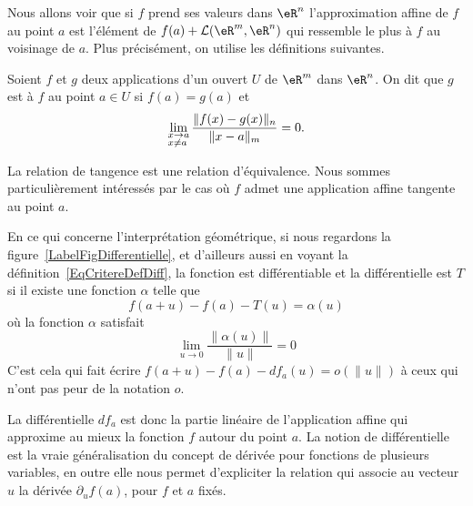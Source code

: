 Nous allons voir que si \( f\) prend ses valeurs dans \( \eR^n\) l'approximation affine de \( f\) au point \( a\) est l'élément de \(  f(a)+\mathcal{L}(\eR^m,\eR^n)\) qui ressemble le plus à \( f\) au voisinage de \( a\). Plus précisément, on utilise les définitions suivantes.
\begin{definition}
	Soient \( f\) et \( g\) deux applications d'un ouvert \( U\) de \( \eR^m\) dans \( \eR^n\). On dit que \( g\) est  à \( f\) au point \( a\in U\) si \( f(a)=g(a)\) et
	\[
		\lim_{\begin{subarray}{l}
				x\to a\\ x\neq a
			\end{subarray}}\frac{\|f(x)-g(x)\|_n}{\|x-a\|_m}=0.
	\]
\end{definition}
La relation de tangence est une relation d'équivalence. Nous sommes particulièrement intéressés par le cas où \( f\) admet une application  affine tangente au point \( a\).


\newcommand{\CaptionFigDifferentielle}{Interprétation géométrique de la différentielle.}

En ce qui concerne l'interprétation géométrique, si nous regardons la figure~\ref{LabelFigDifferentielle}, et d'ailleurs aussi en voyant la définition~\ref{EqCritereDefDiff}, la fonction est différentiable et la différentielle est \( T\) si il existe une fonction \( \alpha\) telle que
\begin{equation}
	f(a+u)-f(a)-T(u)=\alpha(u)
\end{equation}
où la fonction \( \alpha\) satisfait
\begin{equation}		\label{EqPresqueTa}
	\lim_{u\to 0} \frac{ \| \alpha(u)\| }{\| u \|}=0
\end{equation}
C'est cela qui fait écrire \( f(a+u)-f(a)-df_a(u)=o(\| u \|)\) à ceux qui n'ont pas peur de la notation \( o\).

La différentielle \( df_a\) est donc la partie linéaire de l'application affine qui approxime au mieux la fonction \( f\) autour du point \( a\). La notion de différentielle est la vraie généralisation du concept de dérivée pour fonctions de plusieurs variables, en outre elle nous permet d'expliciter la relation qui associe au vecteur \( u\) la dérivée \( \partial_u f(a)\), pour \( f\) et \( a\) fixés.

